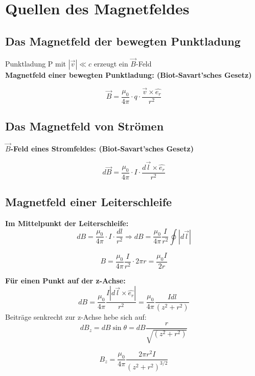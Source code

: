 \section{Quellen des Magnetfeldes}

\subsection{Das Magnetfeld der bewegten Punktladung}
Punktladung P mit $|\Vec{v}| \ll c$ erzeugt ein $\Vec{B}$-Feld \\[1ex]
\textbf{Magnetfeld einer bewegten Punktladung: (Biot-Savart'sches Gesetz)}
\begin{formulabox}
    \[
        \Vec{B} = \frac{\mu_0}{4 \pi} \cdot q \cdot \frac{\Vec{v} \times \hat{e_r}}{r^2}
    \]
\end{formulabox}

\subsection{Das Magnetfeld von Strömen}
\textbf{$\Vec{B}$-Feld eines Stromfeldes: (Biot-Savart'sches Gesetz)}
\begin{formulabox}
    \[
        d\Vec{B} = \frac{\mu_0}{4 \pi} \cdot I \cdot \frac{d\Vec{l} \times \hat{e_r}}{r^2}
    \]
\end{formulabox}

\subsection{Magnetfeld einer Leiterschleife}
\textbf{Im Mittelpunkt der Leiterschleife:}
\[
    dB = \frac{\mu_0}{4 \pi} \cdot I \cdot \frac{dl}{r^2} \Rightarrow dB = \frac{\mu_0}{4 \pi}  \frac{I}{r^2} \oint |d\Vec{l}|
\]
\begin{formulabox}
    \[
        B = \frac{\mu_0}{4 \pi}  \frac{I}{r^2} \cdot 2\pi r = \frac{\mu_0 I}{2 r}
    \]
\end{formulabox}

\textbf{Für einen Punkt auf der z-Achse:}
\[
    dB = \frac{\mu_0}{4 \pi} \frac{I |d\Vec{l} \times \hat{e_r}|}{r^2} = \frac{\mu_0}{4\pi} \frac{I dl}{\left( z^2 + r^2 \right)}
\]
Beiträge senkrecht zur z-Achse hebe sich auf:
\[
    dB_z = dB \sin{\theta} = dB \frac{r}{\sqrt{\left( z^2 + r^2 \right)}}
\]
\begin{formulabox}
    \[
        B_z = \frac{\mu_0}{4\pi} \frac{2 \pi r^2 I}{\left( z^2 + r^2 \right)^{3/2}}
    \]
\end{formulabox}

